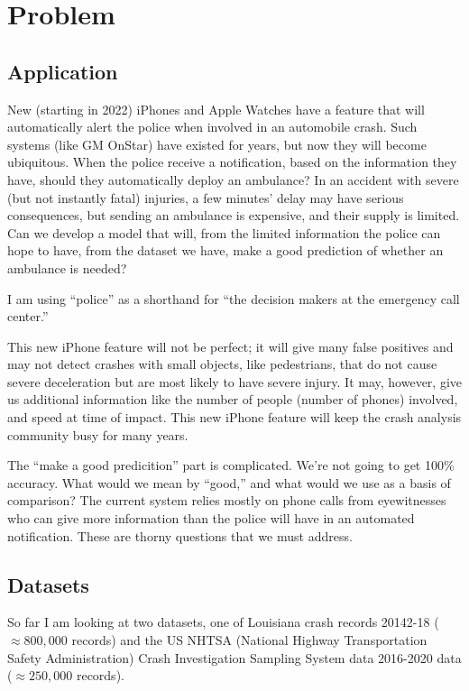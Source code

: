 \section{Problem}

\subsection{Application}

New (starting in 2022) iPhones  and Apple Watches have a feature that will automatically alert the police when involved in an automobile crash.  Such systems (like GM OnStar)  have existed for years, but now they will become ubiquitous.  When the police receive a notification, based on the information they have, should they automatically deploy an ambulance?  In an accident with severe (but not instantly fatal) injuries, a few minutes' delay may have serious consequences, but sending an ambulance is expensive, and their supply is limited.  Can we develop a model that will, from the limited information the police can hope to have, from the dataset we have, make a good prediction of whether an ambulance is needed?  

I am using ``police'' as a shorthand for ``the decision makers at the emergency call center.''  

This new iPhone feature will not be perfect; it will give many false positives and may not detect crashes with small objects, like pedestrians,  that do not cause severe deceleration but are most likely to have severe injury.  It may, however, give us additional information like the number of people (number of phones) involved, and speed at time of impact.  This new iPhone feature will keep the crash analysis community busy for many years.  

The ``make a good predicition'' part is complicated.  We're not going to get 100\% accuracy.   What would we mean by ``good,'' and what would we use as a basis of comparison?  The current system relies mostly on phone calls from eyewitnesses who can give more information than the police will have in an automated notification.  These are thorny questions that we must address.  

\subsection{Datasets}

So far I am looking at two datasets, one of Louisiana crash records 20142-18 ($\approx 800,000$ records) and the US NHTSA (National Highway Transportation Safety Administration) Crash Investigation Sampling System data 2016-2020 data ($\approx 250,000$ records).  

